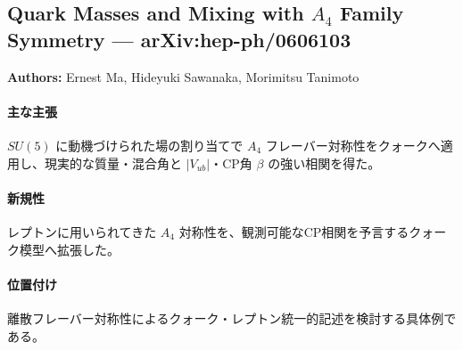 \subsection{Quark Masses and Mixing with $A_4$ Family Symmetry --- arXiv:hep-ph/0606103}

\textbf{Authors:} Ernest Ma, Hideyuki Sawanaka, Morimitsu Tanimoto

\paragraph{主な主張}
$SU(5)$ に動機づけられた場の割り当てで $A_4$ フレーバー対称性をクォークへ適用し、現実的な質量・混合角と $|V_{ub}|$・CP角 $\beta$ の強い相関を得た\cite{Ma:2006sk}。

\paragraph{新規性}
レプトンに用いられてきた $A_4$ 対称性を、観測可能なCP相関を予言するクォーク模型へ拡張した。

\paragraph{位置付け}
離散フレーバー対称性によるクォーク・レプトン統一的記述を検討する具体例である。
